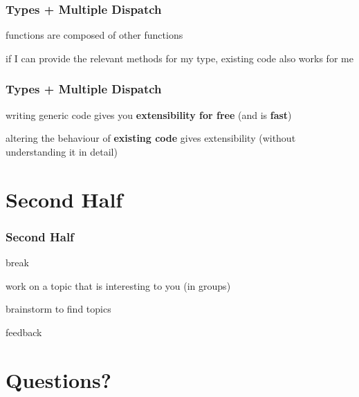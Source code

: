 \documentclass[notes]{beamer}
\newenvironment{wideitemize}{
    \itemize\addtolength{\itemsep}{15pt}\addtolength{\topsep}{10pt}}{\enditemize}
\begin{document}
    \begin{frame}
    \frametitle{Types + Multiple Dispatch}
    \vspace{1cm}
        \begin{wideitemize}
            \item functions are composed of other functions
            \item if I can provide the relevant methods for my type, existing code also works for me
        \end{wideitemize}
        \vspace{1cm}
    \end{frame}

    \begin{frame}
    \frametitle{Types + Multiple Dispatch}
    \vspace{1cm}
        \begin{wideitemize}
            \item writing generic code gives you \textbf{extensibility for free} (and is \textbf{fast})
            \item altering the behaviour of \textbf{existing code} gives extensibility (without understanding it in detail)
        \end{wideitemize}
    \end{frame}


    \section{Second Half}

    \begin{frame}
    \frametitle{Second Half}
    \vspace{1cm}
        \begin{wideitemize}
            \item break
            \item work on a topic that is interesting to you (in groups)
            \item brainstorm to find topics
            \item feedback
        \end{wideitemize}
    \end{frame}

	\section{Questions?}
\end{document}
